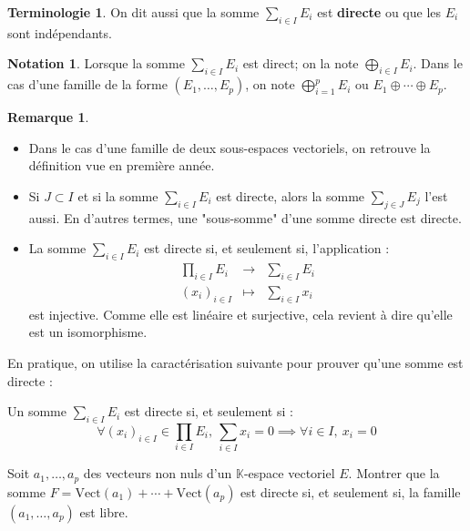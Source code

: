 \documentclass[french]{article}
\newcommand{\K}{\mathbb{K}}
\newcommand{\Vect}{\text{Vect}}
\theoremstyle{plain}
\theoremstyle{definition}
\newtheorem*{rmq}{Remarque}
\newtheorem*{notation}{Notation}
\newtheorem*{terminologie}{Terminologie}
\theoremstyle{remark}
\begin{document}
\begin{terminologie}
	On dit aussi que la somme $\displaystyle\sum_{i\in I}E_i$ est \textbf{directe} ou que les $E_i$ sont indépendants.
\end{terminologie}

\begin{notation}
	Lorsque la somme $\displaystyle\sum_{i\in I} E_i$ est direct; on la note $\displaystyle\bigoplus_{i\in I}E_i$. Dans le cas d'une famille de la forme $(E_1,\ldots,E_p)$, on note $\displaystyle\bigoplus_{i=1}^pE_i$ ou $E_1\oplus\cdots\oplus E_p$.
\end{notation}

\begin{rmq}
	\begin{itemize}
		\item Dans le cas d'une famille de deux sous-espaces vectoriels, on retrouve la définition vue en première année.
		\item Si $J\subset I$ et si la somme $\displaystyle\sum_{i\in I} E_i$ est directe, alors la somme $\displaystyle\sum_{j\in J} E_j$ l'est aussi. En d'autres termes, une "sous-somme" d'une somme directe est directe.
		\item La somme $\displaystyle\sum_{i\in I} E_i$ est directe si, et seulement si, l'application : $$\begin{array}{rcl}
				\displaystyle\prod_{i\in I} E_i&\longrightarrow&\displaystyle\sum_{i\in I} E_i\\
					(x_i)_{i\in I}&\longmapsto&\displaystyle\sum_{i\in I}x_i
			\end{array}$$ est injective. Comme elle est linéaire et surjective, cela revient à dire qu'elle est un isomorphisme.
	\end{itemize}
\end{rmq}

En pratique, on utilise la caractérisation suivante pour prouver qu'une somme est directe :

\begin{prop}{}%
	Un somme $\displaystyle\sum_{i\in I}E_i$ est directe si, et seulement si : $$\forall (x_i)_{i\in I}\in\prod_{i\in I}E_i,\ \sum_{i\in I}x_i=0\implies\forall i\in I,\ x_i=0$$
\end{prop}

\begin{exo}
	Soit $a_1,\ldots,a_p$ des vecteurs non nuls d'un $\K$-espace vectoriel $E$. Montrer que la somme $F=\Vect(a_1)+\cdots+\Vect(a_p)$ est directe si, et seulement si, la famille $(a_1,\ldots,a_p)$ est libre.
\end{exo}
\end{document}
